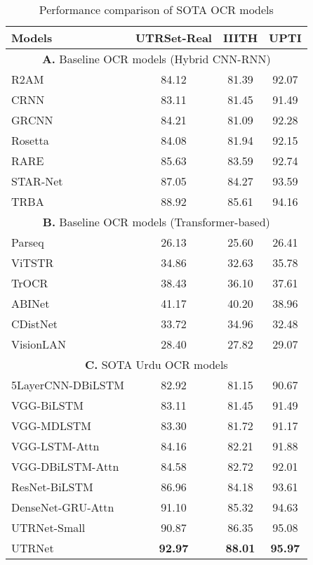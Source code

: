 \documentclass[runningheads]{llncs}
\newcommand{\ModelName}{{UTRNet}\xspace}
\newcommand{\DatasetNameReal}{{UTRSet-Real}\xspace}
\begin{document}
 
\begin{table}[t]
	\centering
	\setlength{\tabcolsep}{15pt}
	\begin{tabular}{lccc}
		\toprule[1.5pt]
		\textbf{Models} & \textbf{\DatasetNameReal} & \textbf{IIITH} & \textbf{UPTI} \\
		\midrule[1.5pt]
		\multicolumn{4}{c}{\textbf{A.} Baseline OCR models (Hybrid CNN-RNN)} \\
		\midrule[0.5pt]
		R2AM \cite{r2am} & 84.12 & 81.39 & 92.07 \\
		CRNN \cite{crnn_orig} & 83.11 & 81.45 & 91.49 \\
		GRCNN \cite{grcnn} & 84.21 & 81.09 & 92.28 \\
		Rosetta \cite{rosetta} & 84.08 & 81.94 & 92.15 \\
		RARE \cite{rare_paper} & 85.63 & 83.59 & 92.74 \\
		STAR-Net \cite{starnet} & 87.05 & 84.27 & 93.59 \\
		TRBA \cite{clovaai} & 88.92 & 85.61 & 94.16 \\ 
		\midrule[0.5pt]
		\multicolumn{4}{c}{\textbf{B.} Baseline OCR models (Transformer-based)} \\
		\midrule[0.5pt]
		Parseq \cite{parseq} & 26.13 & 25.60 & 26.41 \\
		ViTSTR \cite{vit_str} & 34.86 & 32.63 & 35.78 \\
		TrOCR \cite{tr_ocr} & 38.43 & 36.10 & 37.61 \\
		ABINet \cite{abi_net} & 41.17 & 40.20 & 38.96 \\
		CDistNet \cite{cdistnet} & 33.72 & 34.96 & 32.48 \\
		VisionLAN \cite{vision_lan} & 28.40 & 27.82 & 29.07 \\
		\midrule[0.5pt]
		\multicolumn{4}{c}{\textbf{C.} SOTA Urdu OCR models} \\
		\midrule[0.5pt]
            5LayerCNN-DBiLSTM \cite{arabic_hybrid_cnn_rnn_blstm} & 82.92 & 81.15 & 90.67 \\
		VGG-BiLSTM \cite{iiith17urdu} & 83.11 & 81.45 & 91.49 \\
		VGG-MDLSTM \cite{mdlstm_urdu_ocr,mdlstm_urdu_ocr2} & 83.30 & 81.72 & 91.17 \\
            VGG-LSTM-Attn \cite{arabic_attention_encoder_decoder_2021} & 84.16 & 82.21 & 91.88 \\
            VGG-DBiLSTM-Attn \cite{Arabic_attention_cnn_rnn} & 84.58 & 82.72 & 92.01 \\
		ResNet-BiLSTM \cite{resnet_urdu_ocr} & 86.96 & 84.18 & 93.61 \\
		DenseNet-GRU-Attn \cite{gru_attn_paper} & 91.10 & 85.32 & 94.63 \\
		\midrule[0.5pt]
		\ModelName-Small & 90.87 & 86.35 & 95.08 \\
		\ModelName & \textbf{92.97} & \textbf{88.01} & \textbf{95.97} \\
		\bottomrule[1.5pt] 
	\end{tabular}
	\vspace{1em}
	\caption{Performance comparison of SOTA OCR models}
	\label{tab:sota-comparisions}
	\vspace{-2em}
\end{table} 
\end{document}
